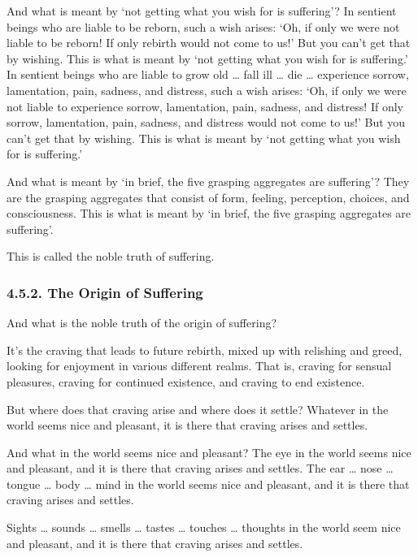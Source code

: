 \documentclass[12pt,openany]{book}%
\begin{document}
And what is meant by ‘not getting what you wish for is suffering’? In sentient beings who are liable to be reborn, such a wish arises: ‘Oh, if only we were not liable to be reborn! If only rebirth would not come to us!’ But you can’t get that by wishing. This is what is meant by ‘not getting what you wish for is suffering.’ In sentient beings who are liable to grow old … fall ill … die … experience sorrow, lamentation, pain, sadness, and distress, such a wish arises: ‘Oh, if only we were not liable to experience sorrow, lamentation, pain, sadness, and distress! If only sorrow, lamentation, pain, sadness, and distress would not come to us!’ But you can’t get that by wishing. This is what is meant by ‘not getting what you wish for is suffering.’ 

And what is meant by ‘in brief, the five grasping aggregates are suffering’? They are the grasping aggregates that consist of form, feeling, perception, choices, and consciousness. This is what is meant by ‘in brief, the five grasping aggregates are suffering’. 

This is called the noble truth of suffering. 

\subsubsection*{4.5.2. The Origin of Suffering }

And what is the noble truth of the origin of suffering? 

It’s the craving that leads to future rebirth, mixed up with relishing and greed, looking for enjoyment in various different realms. That is, craving for sensual pleasures, craving for continued existence, and craving to end existence. 

But where does that craving arise and where does it settle? Whatever in the world seems nice and pleasant, it is there that craving arises and settles. 

And what in the world seems nice and pleasant? The eye in the world seems nice and pleasant, and it is there that craving arises and settles. The ear … nose … tongue … body … mind in the world seems nice and pleasant, and it is there that craving arises and settles. 

Sights … sounds … smells … tastes … touches … thoughts in the world seem nice and pleasant, and it is there that craving arises and settles. 
\end{document}
